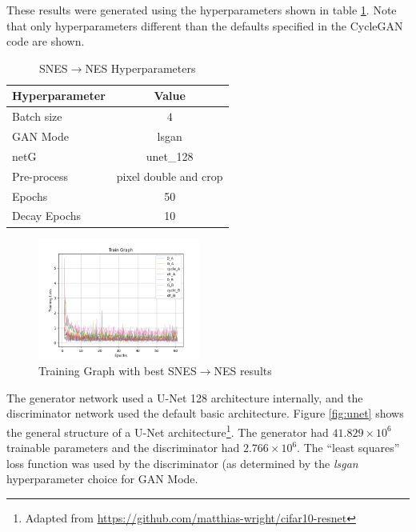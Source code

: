 \documentclass[10pt,twocolumn,letterpaper]{article}
\begin{document}
These results were generated using the hyperparameters shown in table \ref{tab:neshyperparameters}. Note that only hyperparameters different than the defaults specified in the CycleGAN code are shown. 

\begin{table}[H]
   \begin{center}
      \begin{tabular}{|l|c|}
         \hline
         \textbf{Hyperparameter} & \textbf{Value} \\
         \hline\hline
         Batch size     & $4$ \\ 
         \hline
                  GAN Mode     & lsgan\\
         \hline
         netG       & unet\_128  \\ 
         \hline
         Pre-process     & pixel double and crop \\
         \hline
         Epochs     & 50 \\
         \hline
         Decay Epochs    & 10 \\
         \hline         
      \end{tabular}
   \end{center}
   \caption{SNES$\rightarrow$NES Hyperparameters}
   \label{tab:neshyperparameters}
\end{table}

\begin{figure}[H]
   \centering
   \includegraphics[width=0.475\textwidth, height=.3\textwidth]{figures/graphs/train_graph_nes.png}
   \caption{Training Graph with best SNES$\rightarrow$NES results}
   \label{fig:nesgraph}
\end{figure}

The generator network used a U-Net 128 architecture internally, and the discriminator network used the default basic architecture. Figure \ref{fig:unet} shows the general structure of a U-Net architecture\footnote{Adapted from \url{https://github.com/matthias-wright/cifar10-resnet}}. The generator had $41.829 \times 10^6$ trainable parameters and the discriminator had $2.766 \times 10^6$.
The ``least squares'' loss function was used by the discriminator (as determined by the \textit{lsgan} hyperparameter choice for GAN Mode.
\end{document}
